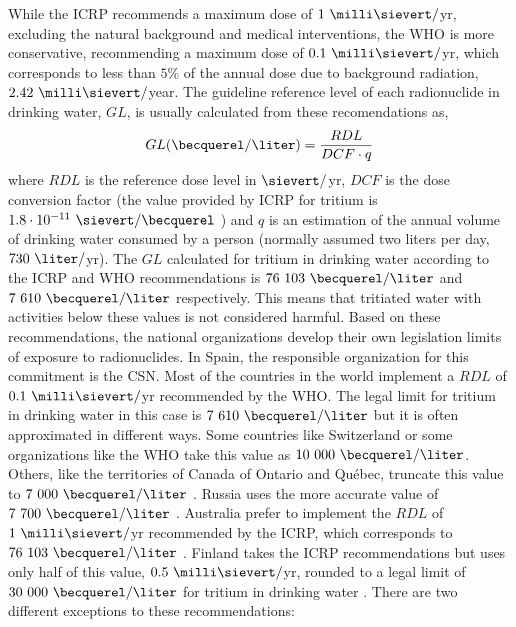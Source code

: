 While the ICRP recommends a maximum dose of $1~\milli\sievert/$yr, excluding the natural background and medical interventions, the WHO is more conservative, recommending a maximum dose of $0.1~\milli\sievert/$yr, which corresponds to less than $5\%$ of the annual dose due to background radiation, $2.42~\milli\sievert/$year. The guideline reference level of each radionuclide in drinking water, $GL$, is usually calculated from these recomendations as,
\begin{equation}
GL (\becquerel/\liter) = \frac{RDL}{DCF \cdot{} q}
\label{eq:Guideline}
\end{equation}
where $RDL$ is the reference dose level in $\sievert/$yr, $DCF$ is the dose conversion factor (the value provided by ICRP for tritium is $1.8 \cdot{} 10^{-11}~\sievert/ \becquerel$ \cite{ICRP_factor}) and $q$ is an estimation of the annual volume of drinking water consumed by a person (normally assumed two liters per day, $730~\liter/$yr). The $GL$ calculated for tritium in drinking water according to the ICRP and WHO recommendations is $76~103~\becquerel/\liter$ and $7~610~\becquerel/\liter$  respectively. This means that tritiated water with activities below these values is not considered harmful. Based on these recommendations, the national organizations develop their own legislation limits of exposure to radionuclides. In Spain, the responsible organization for this commitment is the CSN. Most of the countries in the world implement a $RDL$ of $0.1~\milli\sievert/$yr recommended by the WHO. The legal limit for tritium in drinking water in this case is $7~610~\becquerel/\liter$  but it is often approximated in different ways. Some countries like Switzerland \cite{Switzerland_GL} or some organizations like the WHO \cite{WHO_GL} take this value as $10~000~\becquerel/\liter$. Others, like the territories of Canada of Ontario and Québec, truncate this value to $7~000~\becquerel/\liter$ \cite{Ontario_GL, Quebec_GL}. Russia uses the more accurate value of $7~700~\becquerel/\liter$ \cite{Russia_GL}. Australia prefer to implement the $RDL$ of $1~\milli\sievert/$yr recommended by the ICRP, which corresponds to $76~103~\becquerel/\liter$ \cite{Australia_GL}. Finland takes the ICRP recommendations but uses only half of this value, $0.5~\milli\sievert/$yr, rounded to a legal limit of $30~000~\becquerel/\liter$ for tritium in drinking water \cite{Finland_GL}. There are two different exceptions to these recommendations:
